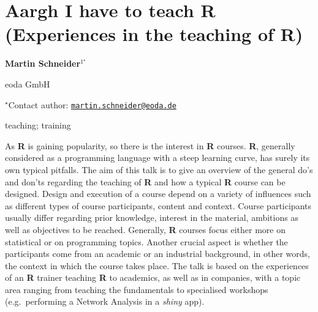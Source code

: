 \documentclass[\main/boa.tex]{subfiles}
\begin{document}
\section{Aargh I have to teach R (Experiences in the teaching of R)}

\begin{center}
  {\bf {} Martin Schneider$^{1^\star}$}
\end{center}

\vskip 0.3cm

\begin{affiliations}
\begin{enumerate}
\begin{minipage}{0.915\textwidth}
\centering
\item eoda GmbH \\[-2pt]
\end{minipage}
\end{enumerate}
$^\star$Contact author: \href{mailto:martin.schneider@eoda.de}{\nolinkurl{martin.schneider@eoda.de}}\\
\end{affiliations}

\vskip 0.5cm

\begin{minipage}{0.915\textwidth}
\keywords teaching; training
\packages {}
\end{minipage}

\vskip 0.8cm

As \textbf{R} is gaining popularity, so there is the interest in
\textbf{R} courses. \textbf{R}, generally considered as a programming
language with a steep learning curve, has surely its own typical
pitfalls. The aim of this talk is to give an overview of the general
do's and don'ts regarding the teaching of \textbf{R} and how a typical
\textbf{R} course can be designed. Design and execution of a course
depend on a variety of influences such as different types of course
participants, content and context. Course participants usually differ
regarding prior knowledge, interest in the material, ambitions as well
as objectives to be reached. Generally, \textbf{R} courses focus either
more on statistical or on programming topics. Another crucial aspect is
whether the participants come from an academic or an industrial
background, in other words, the context in which the course takes place.
The talk is based on the experiences of an \textbf{R} trainer teaching
\textbf{R} to academics, as well as in companies, with a topic area
ranging from teaching the fundamentals to specialised workshops
(e.g.~performing a Network Analysis in a \emph{shiny} app).
\end{document}
